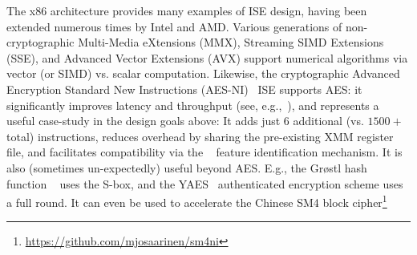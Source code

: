 \noindent
The x86 architecture provides many examples of ISE design,
having been extended numerous times by Intel and AMD.
Various generations of
non-cryptographic
Multi-Media      eXtensions (MMX),
Streaming SIMD  Extensions (SSE),
and
Advanced Vector Extensions (AVX)
support numerical algorithms via vector (or SIMD) vs. scalar computation.  
Likewise, the
    cryptographic
Advanced Encryption Standard New Instructions (AES-NI)~\cite{Gueron:09,DruGueKra:19}
ISE
supports AES: it significantly improves latency and throughput
(see, e.g.,~\cite{FazLopOli:18}),
and represents a useful case-study in the design goals above:
It adds just $6$ additional (vs. $1500+$ total) instructions,
reduces overhead by sharing the pre-existing XMM register file,
and facilitates compatibility via the
~\cite[Chapter 20]{X86:1:18}
feature identification mechanism.
It is also (sometimes un-expectedly) useful beyond AES.
E.g., the Gr{\o}stl hash function ~\cite{GKMMRST:11} uses the S-box,
and
the YAES~\cite{BosVer:14} authenticated encryption scheme uses a full round.
It can even be used to accelerate the Chinese SM4 block cipher\footnote{\url{https://github.com/mjosaarinen/sm4ni}}

